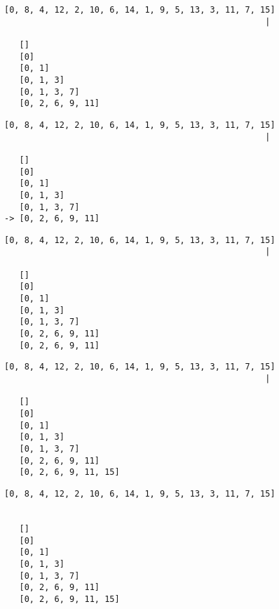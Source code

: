 { \begin{verbatim}
[0, 8, 4, 12, 2, 10, 6, 14, 1, 9, 5, 13, 3, 11, 7, 15]
                                                    |

   []
   [0]
   [0, 1]
   [0, 1, 3]
   [0, 1, 3, 7]
   [0, 2, 6, 9, 11]

\end{verbatim} }

{ \begin{verbatim}
[0, 8, 4, 12, 2, 10, 6, 14, 1, 9, 5, 13, 3, 11, 7, 15]
                                                    |

   []
   [0]
   [0, 1]
   [0, 1, 3]
   [0, 1, 3, 7]
-> [0, 2, 6, 9, 11]

\end{verbatim} }

{ \begin{verbatim}
[0, 8, 4, 12, 2, 10, 6, 14, 1, 9, 5, 13, 3, 11, 7, 15]
                                                    |

   []
   [0]
   [0, 1]
   [0, 1, 3]
   [0, 1, 3, 7]
   [0, 2, 6, 9, 11]
   [0, 2, 6, 9, 11]
\end{verbatim} }

{ \begin{verbatim}
[0, 8, 4, 12, 2, 10, 6, 14, 1, 9, 5, 13, 3, 11, 7, 15]
                                                    |

   []
   [0]
   [0, 1]
   [0, 1, 3]
   [0, 1, 3, 7]
   [0, 2, 6, 9, 11]
   [0, 2, 6, 9, 11, 15]
\end{verbatim} }

{ \begin{verbatim}
[0, 8, 4, 12, 2, 10, 6, 14, 1, 9, 5, 13, 3, 11, 7, 15]


   []
   [0]
   [0, 1]
   [0, 1, 3]
   [0, 1, 3, 7]
   [0, 2, 6, 9, 11]
   [0, 2, 6, 9, 11, 15]
\end{verbatim} }

